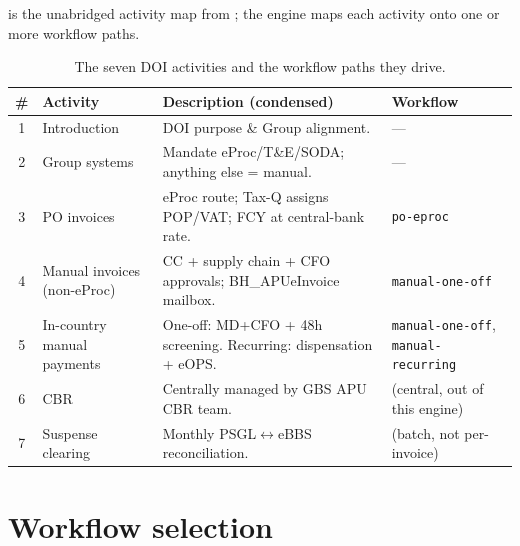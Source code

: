 \documentclass[11pt,a4paper,twoside]{report}
\newcommand{\corpus}{}
\begin{document}
 is the unabridged activity map from
\corpus{}; the
engine maps each activity onto one or more workflow paths.

\begin{table}[htbp]
\centering
\caption{The seven DOI activities and the workflow paths they drive.}
\label{tab:doi-activities}
\small
\begin{tabularx}{\linewidth}{@{}c l X l@{}}
\toprule
\# & \textbf{Activity} & \textbf{Description (condensed)} & \textbf{Workflow} \\ \midrule
1 & Introduction & DOI purpose \& Group alignment. & --- \\
2 & Group systems & Mandate eProc/T\&E/SODA; anything else = manual. & --- \\
3 & PO invoices  & eProc route; Tax-Q assigns POP/VAT; FCY at central-bank rate. & \texttt{po-eproc} \\
4 & Manual invoices (non-eProc) & CC + supply chain + CFO approvals; BH\_APUeInvoice mailbox. & \texttt{manual-one-off} \\
5 & In-country manual payments & One-off: MD+CFO + 48h screening. Recurring: dispensation + eOPS. & \texttt{manual-one-off}, \texttt{manual-recurring} \\
6 & CBR   & Centrally managed by GBS APU CBR team. & (central, out of this engine) \\
7 & Suspense clearing & Monthly PSGL$\leftrightarrow$eBBS reconciliation. & (batch, not per-invoice) \\
\bottomrule
\end{tabularx}
\end{table}

\section{Workflow selection}
\end{document}
